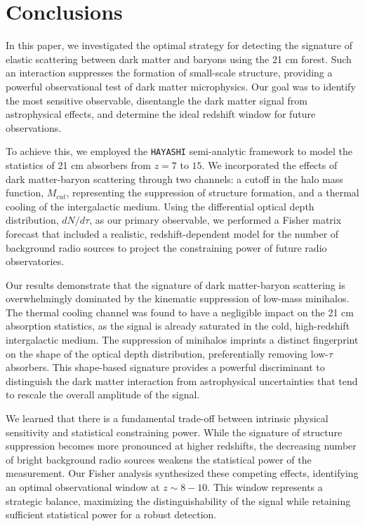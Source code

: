 \documentclass[]{article}
\begin{document}
\section{Conclusions}
\label{sec:conclusions}
In this paper, we investigated the optimal strategy for detecting the signature of elastic scattering between dark matter and baryons using the 21 cm forest. Such an interaction suppresses the formation of small-scale structure, providing a powerful observational test of dark matter microphysics. Our goal was to identify the most sensitive observable, disentangle the dark matter signal from astrophysical effects, and determine the ideal redshift window for future observations.

To achieve this, we employed the \texttt{HAYASHI} semi-analytic framework to model the statistics of 21 cm absorbers from $z=7$ to $15$. We incorporated the effects of dark matter-baryon scattering through two channels: a cutoff in the halo mass function, $M_{cut}$, representing the suppression of structure formation, and a thermal cooling of the intergalactic medium. Using the differential optical depth distribution, $dN/d\tau$, as our primary observable, we performed a Fisher matrix forecast that included a realistic, redshift-dependent model for the number of background radio sources to project the constraining power of future radio observatories.

Our results demonstrate that the signature of dark matter-baryon scattering is overwhelmingly dominated by the kinematic suppression of low-mass minihalos. The thermal cooling channel was found to have a negligible impact on the 21 cm absorption statistics, as the signal is already saturated in the cold, high-redshift intergalactic medium. The suppression of minihalos imprints a distinct fingerprint on the shape of the optical depth distribution, preferentially removing low-$\tau$ absorbers. This shape-based signature provides a powerful discriminant to distinguish the dark matter interaction from astrophysical uncertainties that tend to rescale the overall amplitude of the signal.

We learned that there is a fundamental trade-off between intrinsic physical sensitivity and statistical constraining power. While the signature of structure suppression becomes more pronounced at higher redshifts, the decreasing number of bright background radio sources weakens the statistical power of the measurement. Our Fisher analysis synthesized these competing effects, identifying an optimal observational window at $z \sim 8-10$. This window represents a strategic balance, maximizing the distinguishability of the signal while retaining sufficient statistical power for a robust detection.
\end{document}
